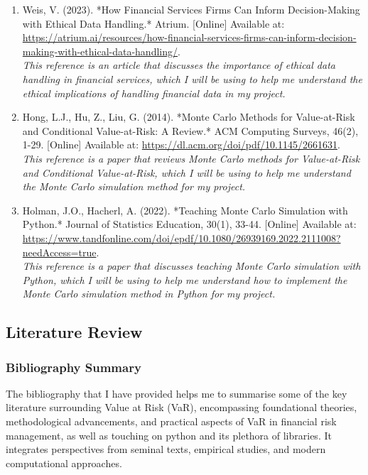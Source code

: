 \documentclass{article}
\begin{document}
\begin{small}
\begin{enumerate}
  \item\label{ref15} Weis, V. (2023). *How Financial Services Firms Can Inform Decision-Making with Ethical Data Handling.* Atrium. [Online] Available at: \url{https://atrium.ai/resources/how-financial-services-firms-can-inform-decision-making-with-ethical-data-handling/}.
  \\\textit{This reference is an article that discusses the importance of ethical data handling in financial services, which I will be using to help me understand the ethical implications of handling financial data in my project.}


  \item\label{ref16} Hong, L.J., Hu, Z., Liu, G. (2014). *Monte Carlo Methods for Value-at-Risk and Conditional Value-at-Risk: A Review.* ACM Computing Surveys, 46(2), 1-29. [Online] Available at: \url{https://dl.acm.org/doi/pdf/10.1145/2661631}.
  \\\textit{This reference is a paper that reviews Monte Carlo methods for Value-at-Risk and Conditional Value-at-Risk, which I will be using to help me understand the Monte Carlo simulation method for my project.}

  \item\label{ref17} Holman, J.O., Hacherl, A. (2022). *Teaching Monte Carlo Simulation with Python.* Journal of Statistics Education, 30(1), 33-44. [Online] Available at: \url{https://www.tandfonline.com/doi/epdf/10.1080/26939169.2022.2111008?needAccess=true}.
  \\\textit{This reference is a paper that discusses teaching Monte Carlo simulation with Python, which I will be using to help me understand how to implement the Monte Carlo simulation method in Python for my project.}
\end{enumerate}
\end{small}

\subsection{Literature Review}

\subsubsection{Bibliography Summary}

The bibliography that I have provided helps me to summarise some of the key literature surrounding Value at Risk (VaR), encompassing foundational theories, methodological advancements, and practical aspects of VaR in financial risk management, as well as touching on python and its plethora of libraries. It integrates perspectives from seminal texts, empirical studies, and modern computational approaches.\\\vspace{0.3cm}
\end{document}
